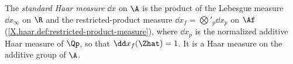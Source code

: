 The \emph{standard Haar measure} $\dd x$ on $\A$ is the product of the Lebesgue measure $\dd x_\infty$ on $\R$ and the
restricted-product measure $\dd x_f=\bigotimes'_p\dd x_p$ on $\Af$ (\cref{X.haar.def:restricted-product-measure}),
where $\dd x_p$ is the normalized additive Haar measure of $\Qp$, so that $\dd x_f(\Zhat)=1$. It is a Haar measure on the
additive group of $\A$.
